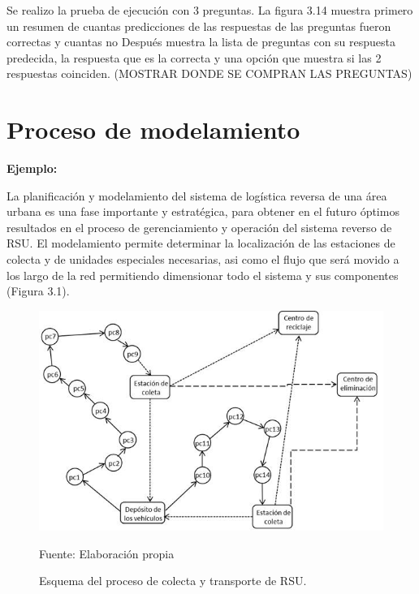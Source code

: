 Se realizo la prueba de ejecución con 3 preguntas. La figura 3.14 muestra primero un resumen de cuantas predicciones de las respuestas de las preguntas fueron correctas y cuantas no Después muestra la lista de preguntas con su respuesta predecida, la respuesta que es la correcta y una opción que muestra si las 2 respuestas coinciden.
(MOSTRAR DONDE SE COMPRAN LAS PREGUNTAS)





















\section{Proceso de modelamiento} 

{\bf Ejemplo:}\par

La planificación y modelamiento del sistema de logística reversa de una área urbana es una fase importante y estratégica, para obtener en el futuro óptimos resultados en el proceso de gerenciamiento y operación del sistema reverso de RSU. El modelamiento permite determinar la localización de las estaciones de colecta y de unidades especiales necesarias, asi como el flujo que será movido a los largo de la red permitiendo dimensionar todo el sistema y sus componentes (Figura 3.1).
\vskip 0.3cm
\begin{figure}[ht]
\begin{center}
\includegraphics[width=.6\textwidth]{Figura3}
\end{center}
\begin{center}
\vskip -0.5cm
\caption{\small{Esquema del proceso de colecta y transporte de RSU.}}
{\small{Fuente: Elaboración propia}}
\end{center}
\end{figure}

